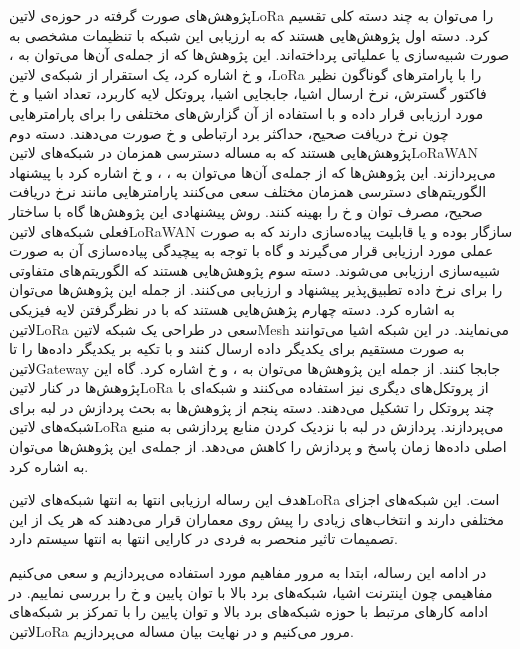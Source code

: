پژوهش‌های صورت گرفته در حوزه‌ی ‌لاتین{LoRa} را می‌توان به چند دسته کلی تقسیم کرد. دسته اول پژوهش‌هایی هستند که به ارزیابی این شبکه با تنظیمات مشخصی
به صورت شبیه‌سازی یا عملیاتی پرداخته‌اند. این پژوهش‌ها که از جمله‌ی آن‌ها می‌توان به ، ، 
و ‌خ اشاره کرد، یک استقرار از شبکه‌ی ‌لاتین{LoRa}
را با پارامترهای گوناگون نظیر فاکتور گسترش، نرخ ارسال اشیا، جابجایی اشیا، پروتکل لایه کاربرد، تعداد اشیا و ‌خ مورد ارزیابی قرار داده و با استفاده از آن گزارش‌های مختلفی را
برای پارامترهایی چون نرخ دریافت صحیح، حداکثر برد ارتباطی و ‌خ صورت می‌دهند.
دسته دوم پژوهش‌هایی هستند که به مساله دسترسی همزمان در شبکه‌های ‌لاتین{LoRaWAN} می‌پردازند. این پژوهش‌ها که از جمله‌ی آن‌ها می‌توان به ، ،  و ‌خ
اشاره کرد با پیشنهاد الگوریتم‌های دسترسی همزمان مختلف سعی می‌کنند پارامترهایی مانند نرخ دریافت صحیح، مصرف توان و ‌خ را بهینه کنند. روش پیشنهادی این پژوهش‌ها گاه با ساختار فعلی
شبکه‌های ‌لاتین{LoRaWAN} سازگار بوده و یا قابلیت پیاده‌سازی دارند که به صورت عملی مورد ارزیابی قرار می‌گیرند و گاه با توجه به پیچیدگی پیاده‌سازی آن به صورت شبیه‌سازی ارزیابی می‌شوند.
دسته سوم پژوهش‌هایی هستند که الگوریتم‌های متفاوتی را برای نرخ داده تطبیق‌پذیر پیشنهاد و ارزیابی می‌کنند. از جمله این پژوهش‌ها می‌توان به  اشاره کرد.
دسته چهارم پژهش‌هایی هستند که با در نظرگرفتن لایه فیزیکی ‌لاتین{LoRa} سعی در طراحی یک شبکه ‌لاتین{Mesh} می‌نمایند. در این شبکه اشیا می‌توانند
به صورت مستقیم برای یکدیگر داده ارسال کنند و با تکیه بر یکدیگر داده‌ها را تا ‌لاتین{Gateway} جابجا کنند. از جمله این پژوهش‌ها می‌توان به ،  و ‌خ اشاره کرد.
گاه این پژوهش‌ها در کنار ‌لاتین{LoRa} از پروتکل‌های دیگری نیز استفاده می‌کنند و شبکه‌ای با چند پروتکل را تشکیل می‌دهند.
دسته پنجم از پژوهش‌ها به بحث پردازش در لبه برای شبکه‌های ‌لاتین{LoRa} می‌پردازند. پردازش در لبه با نزدیک کردن منابع پردازشی به منبع اصلی داده‌ها زمان پاسخ و پردازش را کاهش می‌دهد.
از جمله‌ی این پژوهش‌ها می‌توان به  اشاره کرد.

هدف این رساله ارزیابی انتها به انتها شبکه‌های ‌لاتین{LoRa} است. این شبکه‌های اجزای مختلفی دارند و انتخاب‌های زیادی را پیش روی معماران قرار می‌دهند که هر یک از این تصمیمات
تاثیر منحصر به فردی در کارایی انتها به انتها سیستم دارد.

در ادامه این رساله، ابتدا به مرور مفاهیم مورد استفاده می‌پردازیم و سعی می‌کنیم مفاهیمی چون اینترنت اشیا، شبکه‌های برد بالا با توان پایین و ‌خ را بررسی نماییم. در ادامه
کارهای مرتبط با حوزه شبکه‌های برد بالا و توان پایین را با تمرکز بر شبکه‌های ‌لاتین{LoRa} مرور می‌کنیم و در نهایت بیان مساله می‌پردازیم.
